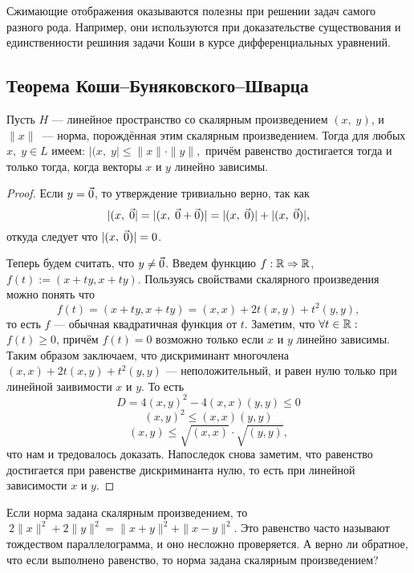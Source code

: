 Сжимающие отображения оказываются полезны при решении задач самого разного рода. Например, они используются при доказательстве существования и единственности решиния задачи Коши в курсе дифференциальных уравнений. 

\subsection*{Теорема Коши--Буняковского--Шварца}


\begin{Theorem}
	Пусть $H$ --- линейное пространство со скалярным произведением $( x,\;y)$, и $\|x\|$ — норма, порождённая этим скалярным произведением. Тогда для любых $x,\;y\in L$ имеем: $|( x,\;y | \leqslant \|x\|\cdot\|y\|,$	причём равенство достигается тогда и только тогда, когда векторы $x$ и $y$ линейно зависимы.
\end{Theorem}
\begin{proof}
	Если $y = \vec{0}$, то утверждение тривиально верно, так как $$ |( x,\;\vec{0} | = |( x,\;\vec{0}+\vec{0})| = |( x,\;\vec{0})|+|( x,\;\vec{0})|,$$
	откуда следует что $|( x,\;\vec{0})| = 0$.
	
	Теперь будем считать, что $y\neq \vec{0}$. Введем функцию $f: \mathbb{R} \Rightarrow\mathbb{R}$, $f(t):=(x+ty, x+ty)$. Пользуясь свойствами скалярного произведения можно понять что $$ f(t) =(x+ty, x+ty) = (x, x)+2t(x, y)+t^2(y, y),$$ то есть $f$ --- обычная квадратичная функция от $t$. Заметим, что $\forall t\in\mathbb{R}:$ $f(t)\geq0$, причём $f(t)=0$ возможно только если $x$ и $y$ линейно зависимы. Таким образом заключаем, что дискриминант многочлена $(x, x)+2t(x, y)+t^2(y, y)$ --- неположительный, и равен нулю только при линейной заивимости $x$ и $y$. То есть 
	\[D = 4(x, y)^2-4(x, x)(y, y)\leq 0\]
	\[(x, y)^2\leq(x, x)(y, y)\]
	\[(x, y)\leq \sqrt{(x, x)}\cdot \sqrt{(y, y)},\]
	что нам и тредовалось доказать. Напоследок снова заметим, что равенство достигается при равенстве дискриминанта нулю, то есть при линейной зависимости $x$ и $y$.
\end{proof}
\begin{Task}
	Если норма задана скалярным произведением, то 
	$\ 2\|x\|^2+2\|y\|^2=\|x+y\|^2+\|x-y\|^2$. Это равенство часто называют тождеством параллелограмма, и оно несложно проверяется. А верно ли обратное, что если выполнено равенство, то норма задана скалярным произведением?
\end{Task}
